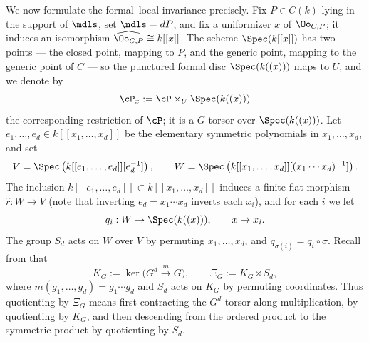 We now formulate the formal--local invariance precisely. Fix $P \in C(k)$ lying in the support of $\mdls$, set $\ndls = dP$,
and fix a uniformizer $x$ of $\Oo_{C,P}$; it induces an isomorphism $\widehat{\Oo_{C,P}} \cong k[[x]]$.
The scheme $\Spec(k[[x]])$ has two points --- the closed point, mapping to $P$, and the generic point, mapping to the generic
point of $C$ --- so the punctured formal disc $\Spec(k((x)))$ maps to $U$, and we denote by
$$\cP_x := \cP \times_U \Spec(k((x)))$$
the corresponding restriction of $\cP$; it is a $G$-torsor over $\Spec(k((x)))$.
Let $e_1, \dots, e_d \in k[[x_1, \dots, x_d]]$ be the elementary symmetric polynomials in $x_1, \dots, x_d$, and set
$$ V = \Spec\left(k[[e_1, \dots, e_d]][e_d^{-1}]\right), \qquad W = \Spec\left(k[[x_1, \dots, x_d]][(x_1 \cdots x_d)^{-1}]\right).$$
The inclusion $k[[e_1, \dots, e_d]] \subset k[[x_1, \dots, x_d]]$ induces a finite flat morphism $\hat{r}: W \to V$
(note that inverting $e_d = x_1 \cdots x_d$ inverts each $x_i$), and for each $i$ we let
$$ q_i : W \to \Spec(k((x))), \qquad x \mapsto x_i.$$
The group $S_d$ acts on $W$ over $V$ by permuting $x_1, \dots, x_d$, and $q_{\sigma(i)} = q_i \circ \sigma$.
Recall from  that
\[
K_G:=\ker\bigl(G^d\xrightarrow{\,m\,}G\bigr),
\qquad
\Xi_G:=K_G\rtimes S_d,
\]
where $m(g_1,\dots,g_d)=g_1\cdots g_d$ and $S_d$ acts on $K_G$ by
permuting coordinates. Thus quotienting by $\Xi_G$ means first contracting
the $G^d$-torsor along multiplication, by quotienting by $K_G$, and then
descending from the ordered product to the symmetric product by quotienting
by $S_d$.

